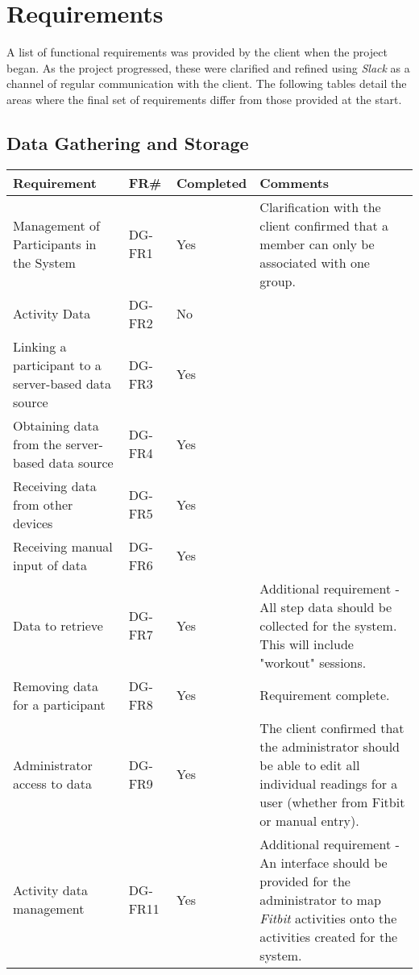 \label{Requirements_chpt}
\chapter{Requirements}

A list of functional requirements was provided by the client when the project began. As the project progressed, these were clarified and refined using \textit{Slack}\cite{slack} as a channel of regular communication with the client. The following tables detail the areas where the final set of requirements differ from those provided at the start.

\section{Data Gathering and Storage}
\begin{tabular}{ |p{5cm}|l|l|p{8cm}|}
\hline
\textbf{Requirement}	&	\textbf{FR\#}	&	\textbf{Completed}	&	\textbf{Comments} \\
\hline
Management of Participants in the System			& DG-FR1	& Yes	&  Clarification with the client confirmed that a member can only be associated with one group. \\
\hline
Activity Data										& DG-FR2	& No	&  \\
\hline
Linking a participant to a server-based data source	& DG-FR3	& Yes	&  \\
\hline
Obtaining data from the server-based data source	& DG-FR4	& Yes	&  \\
\hline
Receiving data from other devices					& DG-FR5	& Yes	&  \\
\hline
Receiving manual input of data						& DG-FR6	& Yes	&  \\
\hline
Data to retrieve 									& DG-FR7	& Yes	& Additional requirement - All step data should be collected for the system. This will include "workout" sessions. \\
\hline
Removing data for a participant						& DG-FR8	& Yes	&  Requirement complete. \\
\hline
Administrator access to data						& DG-FR9	& Yes	& The client confirmed that the administrator should be able to edit all individual readings for a user (whether from Fitbit or manual entry).\\
\hline
Activity data management							& DG-FR11	& Yes	& Additional requirement - An interface should be provided for the administrator to map \textit{Fitbit} activities onto the activities created for the system. \\
\hline
\end{tabular}

